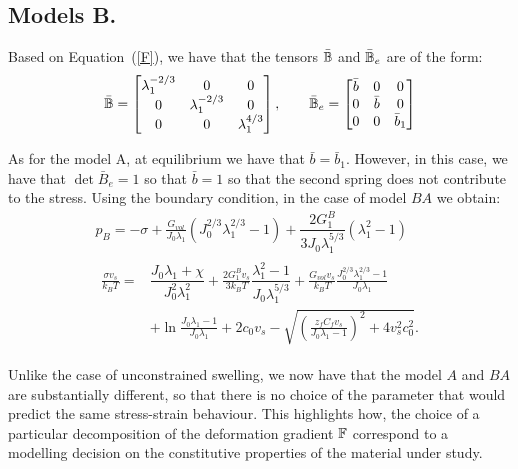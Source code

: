 \subsection{Models B.}
Based on Equation~(\ref{F}), we have that the tensors $\bar{\mathbb{B}}$ and $\bar{\mathbb{B}}_e$ are of the form:
\begin{equation}
\bar{\mathbb{B}}=\begin{bmatrix}
\lambda_1^{-2/3} &0&0\\
0&\lambda_1^{-2/3}&0\\
0&0& \lambda_1^{4/3}
\end{bmatrix}, \qquad
\bar{\mathbb{B}}_e=\begin{bmatrix}
\bar{b} &0&0\\
0&\bar{b}&0\\
0&0& \bar{b}_1
\end{bmatrix}
\end{equation}

As for the model A, at equilibrium we have that $\bar{b}=\bar{b}_1$. However, in this case, we have that $\det \bar{B}_e=1$ so that $\bar{b}=1$ so that the second spring does not contribute to the stress. Using the boundary condition, in the case of model $BA$ we obtain:
\begin{gather}
\displaystyle 
p_{B} = -\sigma + \frac{G_{vol}}{J_0\lambda_1}(J_0^{2/3}\lambda_1^{2/3}-1)+\dfrac{2G^B_1}{3J_0\lambda_1^{5/3}} (\lambda_1^2-1) \\
\begin{aligned}
\frac{\sigma v_s}{k_B T}=&\dfrac{J_0\lambda_1+\chi}{J_0^2\lambda^2_1}+\frac{2G_1^Bv_s}{3k_BT} \dfrac{\lambda^2_1-1}{J_0 \lambda_1^{5/3}}+\frac{G_{vol}v_s}{k_BT}\frac{J_0^{2/3}\lambda_1^{2/3}-1}{J_0\lambda_1}\\[1.5mm]
& +\ln \frac{J_0\lambda_1-1}{J_0\lambda_1}+2c_0v_s-\sqrt{\left(\frac{z_fC_fv_s}{J_0\lambda_1-1}\right)^2+4v_s^2c^2_0}.\label{compAB}
\end{aligned}
\end{gather}

Unlike the case of unconstrained swelling, we now have that the model $A$ and $BA$ are substantially different, so that there is no choice of the parameter that would predict the same stress-strain behaviour. This highlights how, the choice of a particular decomposition of the deformation gradient $\mathbb{F}$ correspond to a modelling decision on the constitutive properties of the material under study.  

